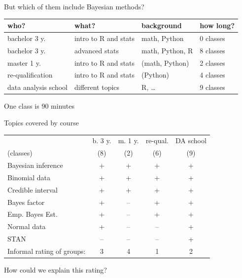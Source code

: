 \documentclass[13pt, t]{beamer}
\begin{document}
\begin{frame}{But which of them include Bayesian methods?}
\begin{tabular}{llll}
who?                 & what?                        & background     & how long? \\ \hline
bachelor 3 y.        & intro to R and stats & math, Python   & 0  classes\\
\rowcolor{colorblue}
bachelor 3 y.        & advanced stats               & math, Python, R  & 8 classes   \\
\rowcolor{colorblue}
master 1 y.          & intro to R and stats   & (math, Python) & 2 classes \\
\rowcolor{colorblue}
re-qualification     & intro to R and stats   & (Python)        & 4 classes \\
\rowcolor{colorblue}
data analysis school & different topics            & R, …       & 9 classes
\end{tabular}
\vfill
One class is 90 minutes
\end{frame}

\begin{frame}{Topics covered by course}
\begin{tabular}{lcccc}
                           & b. 3 y. & m. 1 y. & re-qual. & DA school \\
(classes)                           & (8)             & (2)           & (6)                & (9)               \\ \hline     
Bayesian inference         & +             & +           & +                & +                    \\
Binomial data              & +             & +           & +                & +                    \\
Credible interval          & +             & +           & +                & +                    \\
Bayes factor               & +             & --           & +                & +                    \\
Emp. Bayes Est. & +             & --           & +                & +                    \\
Normal data                & +             & --           & --                & +                    \\
STAN                       & --             & --           & --                & +  \pause \\ \hline
Informal rating of groups: & 3 & 4 & 1 & 2 
\end{tabular}
\pause
\vfill
How could we explain this rating?
\end{frame}
\end{document}
